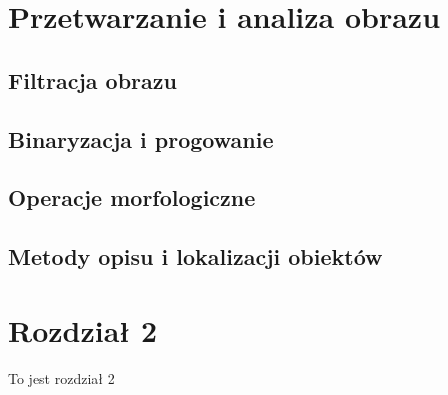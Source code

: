 \documentclass[document.tex]{subfiles}
\begin{document}
\chapter{Przetwarzanie i analiza obrazu}
\section{Filtracja obrazu}
\section{Binaryzacja i progowanie}
\section{Operacje morfologiczne}
\section{Metody opisu i lokalizacji obiektów}

\chapter{Rozdział 2}
To jest rozdział 2
\end{document}
